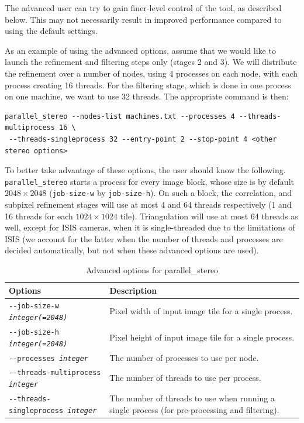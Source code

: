 The advanced user can try to gain finer-level control of the tool, as
described below. This may not necessarily result in improved performance
compared to using the default settings.

As an example of using the advanced options, assume that we would like
to launch the refinement and filtering steps only (stages 2 and 3). We
will distribute the refinement over a number of nodes, using 4 processes
on each node, with each process creating 16 threads. For the filtering
stage, which is done in one process on one machine, we want to use 32
threads. The appropriate command is then:

\begin{verbatim}
parallel_stereo --nodes-list machines.txt --processes 4 --threads-multiprocess 16 \
 --threads-singleprocess 32 --entry-point 2 --stop-point 4 <other stereo options>
\end{verbatim}

To better take advantage of these options, the user should know the following.
\texttt{parallel\_stereo} starts a process for every image block, whose
size is by default $2048 \times 2048$ (\texttt{job-size-w} by
\texttt{job-size-h}). On such a block, the correlation, and subpixel
refinement stages will use at most 4 and 64 threads respectively (1 and
16 threads for each $1024 \times 1024$ tile). Triangulation will use at
most 64 threads as well, except for ISIS cameras, when it is
single-threaded due to the limitations of ISIS (we account for the
latter when the number of threads and processes are decided
automatically, but not when these advanced options are used).

\begin{longtable}{|l|p{7.5cm}|}
\caption{Advanced options for parallel\_stereo}
\label{tbl:advancedparallelstereo}
\endfirsthead
\endhead
\endfoot
\endlastfoot
\hline
Options & Description \\ \hline \hline
\texttt{-\/-job-size-w \textit{integer(=2048)}} & Pixel width of input
image tile for a single process. \\ \hline
\texttt{-\/-job-size-h \textit{integer(=2048)}} & Pixel height of input
image tile for a single process. \\ \hline
\texttt{-\/-processes \textit{integer}} & The number of processes to
use per node. \\ \hline
\texttt{-\/-threads-multiprocess \textit{integer}} & The number of threads to use per process.\\ \hline
\texttt{-\/-threads-singleprocess \textit{integer}} & The number of threads to use when running a single process (for pre-processing and filtering).\\ \hline
\end{longtable}

